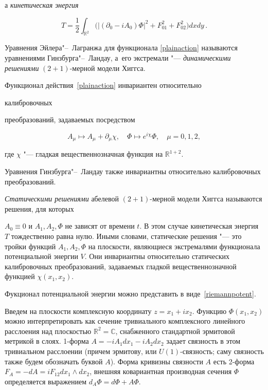  а \textit{кинетическая энергия} %

\begin{equation}

\label{plainkinetic}

T=\dfrac12\int _{\mathbb R^2}\bigl(|(\partial_0-iA_0)\Phi|^2+

F_{01}^2+F_{02}^2\bigr)dxdy\,.

\end{equation}



Уравнения Эйлера"--~Лагранжа для функционала \eqref{plainaction} называются уравнениями Гинзбурга"--~Ландау, а~его экстремали "---  \textit{динамическими решениями} $(2+1)$-мерной модели Хиггса. 



Функционал действия~\eqref{plainaction} инвариантен относительно

калибровочных

преобразований, задаваемых посредством

\begin{equation*}


A_\mu\longmapsto A_\mu+\partial_\mu\chi,\quad

\Phi\longmapsto e^{i\chi}\Phi,\quad\mu=0, 1, 2,

\end{equation*}

где $\chi$ "--- гладкая вещественнозначная функция на $\mathbb R^{1+2}$. 

Уравнения Гинзбурга"--~Ландау также инвариантны относительно калибровочных преобразований.



\textit{Статическими решениями} абелевой $(2+1)$-мерной модели Хиггса называются решения, для которых 

$A_0\equiv0$ и $A_1,A_2,\Phi$ не зависят от времени $t$. В этом случае кинетическая энергия $T$ тождественно равна нулю. Иными словами, статические решения "--- это тройки функций $A_1,A_2,\Phi$ на плоскости, являющиеся экстремалями функционала потенциальной энергии $V$. Они инвариантны относительно статических калибровочных преобразований, задаваемых гладкой вещественнозначной функцией $\chi(x_1,x_2)$.



Фукционал потенциальной энергии можно представить в виде~\eqref{riemannpotent}.

Введем на плоскости комплексную координату $z=x_1+ix_2$. Функцию $\Phi(x_1,x_2)$ можно интерпретировать как сечение тривиального комплексного линейного расслоения над плоскостью $\mathbb R^2=\mathbb C$, снабженного стандартной эрмитовой метрикой в слоях. 1-форма $A=-iA_1dx_1-iA_2dx_2$ задает связность в этом тривиальном расслоении (причем эрмитову, или $U(1)$-связность; саму связность также будем обозначать буквой $A$). Форма кривизны связности $A$ есть 2-форма $F_A=-dA=iF_{12}dx_1\wedge dx_2$, внешняя ковариантная производная сечения $\Phi$ определяется выражением $d_A\Phi=d\Phi+A\Phi$. 



